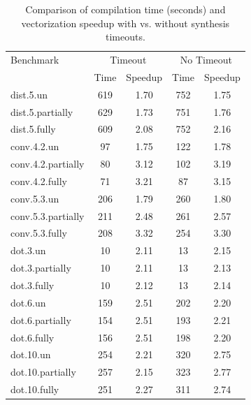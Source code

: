 \begin{table}
    \caption{Comparison of compilation time (seconds) and vectorization speedup with vs. without synthesis timeouts.}\label{tab:ilp-ablation}
    \small
    \centering
    \begin{tabular}{lcccc}
        \toprule
        Benchmark & \multicolumn{2}{c}{Timeout} & \multicolumn{2}{c}{No Timeout}\\\cline{2-5}

         & Time & Speedup & Time & Speedup \\\midrule
        dist.5.un & 619 & 1.70 & 752 & 1.75 \\
        dist.5.partially & 629 & 1.73 & 751 & 1.76 \\
        dist.5.fully & 609 & 2.08 & 752 & 2.16 \\
        \midrule
        conv.4.2.un & 97 & 1.75 & 122 & 1.78 \\
        conv.4.2.partially & 80 & 3.12 & 102 & 3.19 \\
        conv.4.2.fully & 71 & 3.21 & 87 & 3.15 \\
        \midrule
        conv.5.3.un & 206 & 1.79 & 260 & 1.80 \\
        conv.5.3.partially & 211 & 2.48 & 261 & 2.57 \\
        conv.5.3.fully & 208 & 3.32 & 254 & 3.30 \\
        \midrule
        dot.3.un & 10 & 2.11 & 13 & 2.15 \\
        dot.3.partially & 10 & 2.11 & 13 & 2.13 \\
        dot.3.fully & 10 & 2.12 & 13 & 2.14 \\
        \midrule
        dot.6.un & 159 & 2.51 & 202 & 2.20 \\
        dot.6.partially & 154 & 2.51 & 193 & 2.21 \\
        dot.6.fully & 156 & 2.51 & 198 & 2.20 \\
        \midrule
        dot.10.un & 254 & 2.21 & 320 & 2.75 \\
        dot.10.partially & 257 & 2.15 & 323 & 2.77 \\
        dot.10.fully & 251 & 2.27 & 311 & 2.74 \\
        \bottomrule
    \end{tabular}
\end{table}



